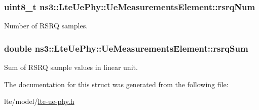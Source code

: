 \subsubsection[{\texorpdfstring{rsrq\+Num}{rsrqNum}}]{\setlength{\rightskip}{0pt plus 5cm}uint8\+\_\+t ns3\+::\+Lte\+Ue\+Phy\+::\+Ue\+Measurements\+Element\+::rsrq\+Num}\hypertarget{structns3_1_1LteUePhy_1_1UeMeasurementsElement_ac8f7ca77d98db99d432f1190aeacd77c}{}\label{structns3_1_1LteUePhy_1_1UeMeasurementsElement_ac8f7ca77d98db99d432f1190aeacd77c}


Number of R\+S\+RQ samples. 

\subsubsection[{\texorpdfstring{rsrq\+Sum}{rsrqSum}}]{\setlength{\rightskip}{0pt plus 5cm}double ns3\+::\+Lte\+Ue\+Phy\+::\+Ue\+Measurements\+Element\+::rsrq\+Sum}\hypertarget{structns3_1_1LteUePhy_1_1UeMeasurementsElement_a23143f6e7f09461d404cf61facabe72d}{}\label{structns3_1_1LteUePhy_1_1UeMeasurementsElement_a23143f6e7f09461d404cf61facabe72d}


Sum of R\+S\+RQ sample values in linear unit. 



The documentation for this struct was generated from the following file\+:\begin{DoxyCompactItemize}
\item 
lte/model/\hyperlink{lte-ue-phy_8h}{lte-\/ue-\/phy.\+h}\end{DoxyCompactItemize}
